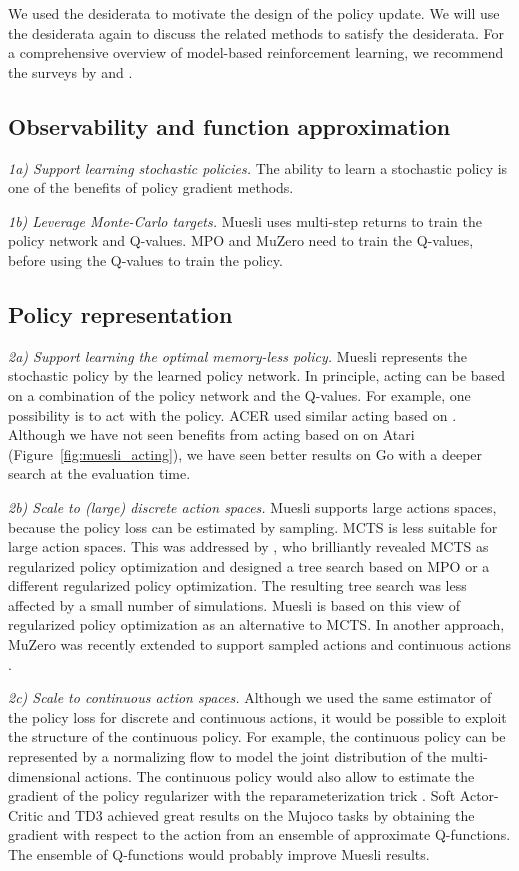\documentclass{article}
\begin{document}
We used the desiderata to motivate the design of the policy update.
We will use the desiderata again to discuss the related methods to satisfy the desiderata.
For a comprehensive overview of model-based reinforcement learning, we recommend the surveys by \citet{moerland2020survey} and \citet{hamrick2019analogues}.

\subsection{Observability and function approximation}
\textit{1a) Support learning stochastic policies.} The ability to learn a stochastic policy is one of the benefits of policy gradient methods.

\textit{1b) Leverage Monte-Carlo targets.} Muesli uses multi-step returns to train the policy network and Q-values.
MPO and MuZero need to train the Q-values, before using the Q-values to train the policy.

\subsection{Policy representation}
\textit{2a) Support learning the optimal memory-less policy.} Muesli represents the stochastic policy by the learned policy network. In principle, acting can be based on a combination of the policy network and the Q-values. For example, one possibility is to act with the  policy. ACER \citep{wang2016acer} used similar acting based on . Although we have not seen benefits from acting based on  on Atari (Figure~\ref{fig:muesli_acting}), we have seen better results on Go with a deeper search at the evaluation time.

\textit{2b) Scale to (large) discrete action spaces.}
Muesli supports large actions spaces, because the policy loss can be estimated by sampling. MCTS is less suitable for large action spaces. This was addressed by \citet{jbgrill2020}, who brilliantly revealed MCTS as regularized policy optimization and designed a tree search based on MPO or a different regularized policy optimization. The resulting tree search was less affected by a small number of simulations. Muesli is based on this view of regularized policy optimization as an alternative to MCTS. In another approach, MuZero was recently extended to support sampled actions and continuous actions \citep{schrittwieser2021continuous}.

\textit{2c) Scale to continuous action spaces.} Although we used the same estimator of the policy loss for discrete and continuous actions, it would be possible to exploit the structure of the continuous policy. For example, the continuous policy can be represented by a normalizing flow \citep{papamakarios2019flows} to model the joint distribution of the multi-dimensional actions.
The continuous policy would also allow to estimate the gradient of the policy regularizer with the reparameterization trick \citep{kingma2013vae,rezende2014vae}. Soft Actor-Critic \citep{haarnoja2018sac} and TD3 \citep{fujimoto2018addressing} achieved great results on the Mujoco tasks by obtaining the gradient with respect to the action from an ensemble of approximate Q-functions. The ensemble of Q-functions would probably improve Muesli results.
\end{document}

